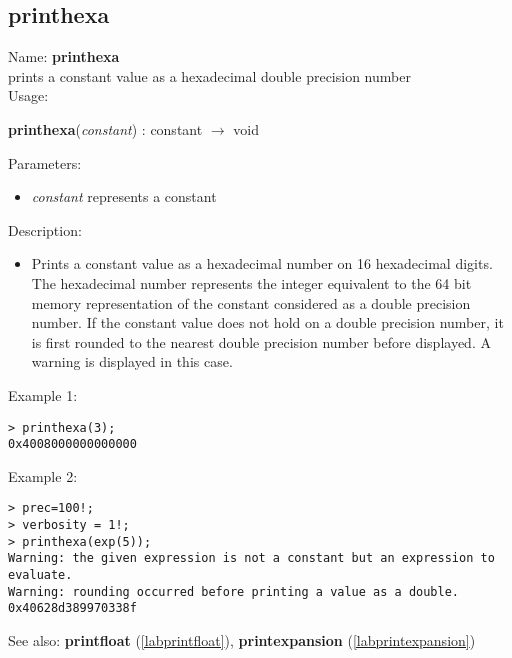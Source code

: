 \subsection{printhexa}
\label{labprinthexa}
\noindent Name: \textbf{printhexa}\\
prints a constant value as a hexadecimal double precision number\\

\noindent Usage: 
\begin{center}
\textbf{printhexa}(\emph{constant}) : \textsf{constant} $\rightarrow$ \textsf{void}\\
\end{center}
Parameters: 
\begin{itemize}
\item \emph{constant} represents a constant
\end{itemize}
\noindent Description: \begin{itemize}

\item Prints a constant value as a hexadecimal number on 16 hexadecimal
   digits. The hexadecimal number represents the integer equivalent to
   the 64 bit memory representation of the constant considered as a
   double precision number.
   If the constant value does not hold on a double precision number, it
   is first rounded to the nearest double precision number before
   displayed. A warning is displayed in this case.
\end{itemize}
\noindent Example 1: 
\begin{center}\begin{minipage}{15cm}\begin{Verbatim}[frame=single]
> printhexa(3);
0x4008000000000000
\end{Verbatim}
\end{minipage}\end{center}
\noindent Example 2: 
\begin{center}\begin{minipage}{15cm}\begin{Verbatim}[frame=single]
> prec=100!;
> verbosity = 1!;
> printhexa(exp(5));
Warning: the given expression is not a constant but an expression to evaluate.
Warning: rounding occurred before printing a value as a double.
0x40628d389970338f
\end{Verbatim}
\end{minipage}\end{center}
See also: \textbf{printfloat} (\ref{labprintfloat}), \textbf{printexpansion} (\ref{labprintexpansion})
